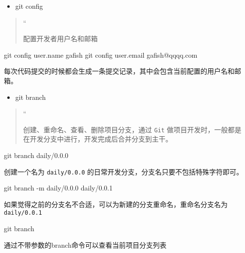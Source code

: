 \documentclass[
]{article}
\newenvironment{Shaded}{}{}
\newcommand{\NormalTok}[1]{#1}
\begin{document}
\begin{itemize}
\item
  git config
\end{itemize}

\begin{quote}
``

配置开发者用户名和邮箱
\end{quote}

\begin{Shaded}
\begin{Highlighting}[]
\NormalTok{git config user.name gafish}
\NormalTok{git config user.email gafish@qqqq.com}
\end{Highlighting}
\end{Shaded}

每次代码提交的时候都会生成一条提交记录，其中会包含当前配置的用户名和邮箱。

\begin{itemize}
\item
  git branch
\end{itemize}

\begin{quote}
``

创建、重命名、查看、删除项目分支，通过 \texttt{Git}
做项目开发时，一般都是在开发分支中进行，开发完成后合并分支到主干。
\end{quote}

\begin{Shaded}
\begin{Highlighting}[]
\NormalTok{git branch daily/0.0.0}
\end{Highlighting}
\end{Shaded}

创建一个名为 \texttt{daily/0.0.0}
的日常开发分支，分支名只要不包括特殊字符即可。

\begin{Shaded}
\begin{Highlighting}[]
\NormalTok{git branch {-}m daily/0.0.0 daily/0.0.1}
\end{Highlighting}
\end{Shaded}

如果觉得之前的分支名不合适，可以为新建的分支重命名，重命名分支名为
\texttt{daily/0.0.1}

\begin{Shaded}
\begin{Highlighting}[]
\NormalTok{git branch}
\end{Highlighting}
\end{Shaded}

通过不带参数的branch命令可以查看当前项目分支列表
\end{document}

